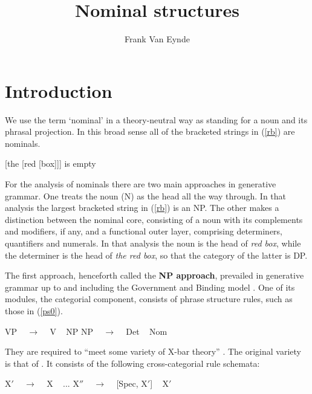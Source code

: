 \documentclass[output=paper]{langsci/langscibook}
\author{Frank Van Eynde\affiliation{University of Leuven}}
\title{Nominal structures}
\begin{document}
\label{chap-np}

\section{Introduction}


We use the term `nominal' in a theory-neutral way as standing for a noun
and its phrasal projection. In this broad sense all of the bracketed 
strings in (\ref{rb}) are nominals. 

\begin{exe} 
\ex\label{rb}  [the [red [box]]] is empty
\end{exe} 
  
\noindent
For the analysis of nominals there are two main approaches in generative grammar. 
One treats the noun (N) as the head all the way through. In that analysis the 
largest bracketed string in (\ref{rb}) is an NP. 
The other makes a distinction between the nominal core, 
consisting of a noun with its complements and modifiers, if any,  
and a functional outer layer, comprising determiners, quantifiers and 
numerals. In that analysis the noun is the head of {\it red box}, 
while the determiner is the head of {\it the red box\/}, so that the category 
of the latter is DP. 

The first approach, henceforth called the {\bf NP approach}, prevailed in 
generative grammar up to and including the Government and Binding model
\citep{Chomsky81}. One of its modules, the categorial component, 
consists of phrase structure rules, such as those in (\ref{ps0}). 

\begin{exe} 
\ex\label{ps0}   
\begin{xlist}
\ex  VP ~ $\rightarrow$ ~ V ~ NP 
\ex  NP ~ $\rightarrow$ ~ Det ~ Nom
\end{xlist} 
\end{exe}

\noindent
They are required to ``meet some variety of X-bar theory'' \citep[5]{Chomsky81}. 
The original variety is that of \citet{Chomsky70}. It consists of the following
cross-categorial rule schemata:

\begin{exe} 
\ex\label{xbar} 
\begin{xlist} 
\ex\label{xbar1}   X$'$ ~ $\rightarrow$ ~ X ~  ... 
\ex\label{xbar2}   X$''$ ~ $\rightarrow$ ~ [Spec, X$'$] ~ X$'$ 
\end{xlist} 
\end{exe} 
\end{document}
